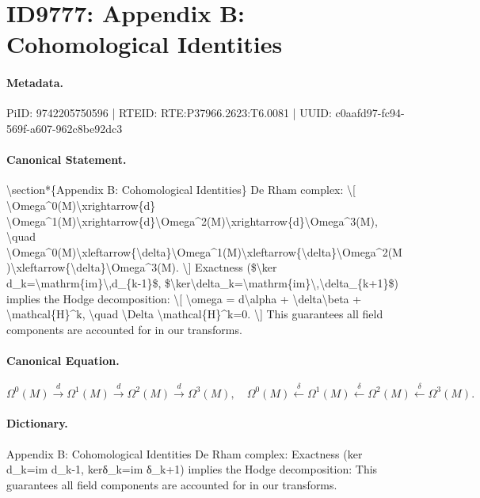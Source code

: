 \section*{ID9777: Appendix B: Cohomological Identities}
\paragraph{Metadata.}
PiID: 9742205750596 | RTEID: RTE:P37966.2623:T6.0081 | UUID: c0aafd97-fc94-569f-a607-962c8be92dc3

\paragraph{Canonical Statement.}
\textbackslash{}section*\{Appendix B: Cohomological Identities\} De Rham complex: \textbackslash{}[ \textbackslash{}Omega\textasciicircum{}0(M)\textbackslash{}xrightarrow\{d\} \textbackslash{}Omega\textasciicircum{}1(M)\textbackslash{}xrightarrow\{d\}\textbackslash{}Omega\textasciicircum{}2(M)\textbackslash{}xrightarrow\{d\}\textbackslash{}Omega\textasciicircum{}3(M), \textbackslash{}quad \textbackslash{}Omega\textasciicircum{}0(M)\textbackslash{}xleftarrow\{\textbackslash{}delta\}\textbackslash{}Omega\textasciicircum{}1(M)\textbackslash{}xleftarrow\{\textbackslash{}delta\}\textbackslash{}Omega\textasciicircum{}2(M)\textbackslash{}xleftarrow\{\textbackslash{}delta\}\textbackslash{}Omega\textasciicircum{}3(M). \textbackslash{}] Exactness (\$\textbackslash{}ker d\_k=\textbackslash{}mathrm\{im\}\textbackslash{},d\_\{k-1\}\$, \$\textbackslash{}ker\textbackslash{}delta\_k=\textbackslash{}mathrm\{im\}\textbackslash{},\textbackslash{}delta\_\{k+1\}\$) implies the Hodge decomposition: \textbackslash{}[ \textbackslash{}omega = d\textbackslash{}alpha + \textbackslash{}delta\textbackslash{}beta + \textbackslash{}mathcal\{H\}\textasciicircum{}k, \textbackslash{}quad \textbackslash{}Delta \textbackslash{}mathcal\{H\}\textasciicircum{}k=0. \textbackslash{}] This guarantees all field components are accounted for in our transforms.

\paragraph{Canonical Equation.}
\[
\Omega^0(M)\xrightarrow{d} \Omega^1(M)\xrightarrow{d}\Omega^2(M)\xrightarrow{d}\Omega^3(M), \quad \Omega^0(M)\xleftarrow{\delta}\Omega^1(M)\xleftarrow{\delta}\Omega^2(M)\xleftarrow{\delta}\Omega^3(M).
\]

\paragraph{Dictionary.}
Appendix B: Cohomological Identities De Rham complex: Exactness (ker d\_k=im d\_k-1, kerδ\_k=im δ\_k+1) implies the Hodge decomposition: This guarantees all field components are accounted for in our transforms.

